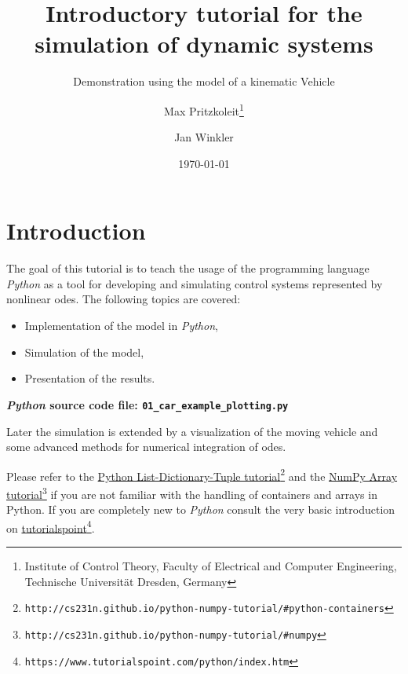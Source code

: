 \documentclass[a4paper,11pt,headinclude=true,headsepline,parskip=half,DIV=13]{scrartcl}
\title{Introductory tutorial for the simulation of dynamic systems}
\subtitle{Demonstration using the model of a kinematic Vehicle}
\author{Max Pritzkoleit\thanks{Institute of Control Theory, Faculty of Electrical and Computer Engineering, Technische Universität Dresden, Germany} \and Jan Winkler\footnotemark[1]}
\date{\today}
\newcommand{\py}{\emph{Python}\xspace}
\begin{document}
\maketitle




\tableofcontents

\newpage

\section{Introduction}
The goal of this tutorial is to teach the usage of the programming language \py as a tool for developing and simulating control systems  represented by nonlinear \glspl{ode}. The following topics are covered:
\begin{itemize}
\item Implementation of the model in \py,
\item Simulation of the model,
\item Presentation of the results.
\end{itemize}
\textbf{\py source code file: \texttt{01\_car\_example\_plotting.py}}

Later the simulation is extended by a visualization of the moving vehicle and some advanced methods for numerical integration of \glspl{ode}.

Please refer to the \href{http://cs231n.github.io/python-numpy-tutorial/#python-containers}{Python List-Dictionary-Tuple tutorial}\footnote{\texttt{http://cs231n.github.io/python-numpy-tutorial/\#python-containers}} and the \href{http://cs231n.github.io/python-numpy-tutorial/#numpy}{NumPy Array tutorial}\footnote{\texttt{http://cs231n.github.io/python-numpy-tutorial/\#numpy}} if you are not familiar with the handling of containers and arrays in Python. If you are completely new to \py consult the very basic introduction on \href{https://www.tutorialspoint.com/python/index.htm}{tutorialspoint}\footnote{\texttt{https://www.tutorialspoint.com/python/index.htm}}.
\end{document}
